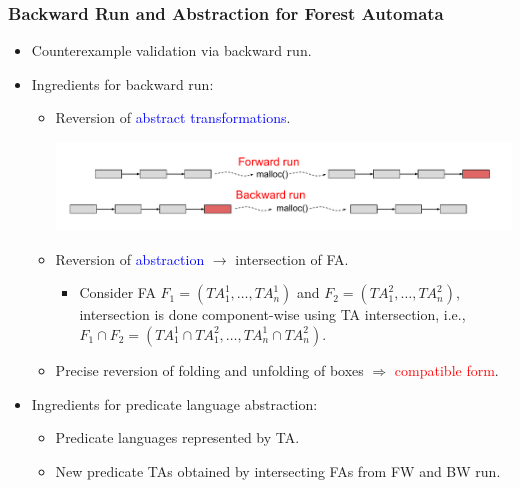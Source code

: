 \documentclass{beamer}
\newcommand{\hlbl}[1]{\textcolor{blue}{#1}}
\newcommand{\hlgr}[1]{\textcolor{olive!50!green}{#1}}
\newcommand{\hlrd}[1]{\textcolor{red}{#1}}
\begin{document}
\begin{frame}
\frametitle{Backward Run and Abstraction for Forest Automata}
		\begin{itemize}
		\item Counterexample validation via backward run.
		\item \hlgr{Ingredients for backward run}:
		\begin{itemize}
			\item Reversion of \hlbl{abstract transformations}.
			\begin{center}
				\includegraphics[scale=0.4]{ex/at.pdf}
			\end{center}
			\pause
			\item Reversion of \hlbl{abstraction} $\rightarrow$ \hlgr{intersection} of FA.
			\begin{itemize}
				\item Consider FA $F_1=(TA_1^1,\ldots,TA_n^1)$ and $F_2=(TA_1^2,\ldots,TA_n^2)$,
					intersection is done \hlgr{component-wise} using TA intersection, i.e.,
					$F_1 \cap F_2 = (TA_1^1 \cap TA_1^2,\ldots,TA_n^1 \cap TA_n^2)$.
			\end{itemize}
		\item Precise reversion of folding and unfolding of boxes $\Rightarrow$ \hlrd{compatible form}.
		\end{itemize}
		\pause
		\item \hlgr{Ingredients for predicate language abstraction}:
		\begin{itemize}
			\item Predicate languages represented by TA.
			\item New predicate TAs obtained by intersecting FAs from FW and BW run.
		\end{itemize}
	\end{itemize}

\end{frame}
\end{document}
